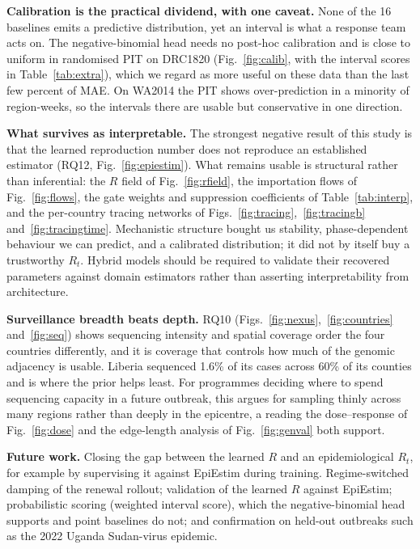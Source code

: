 \documentclass[conference]{IEEEtran}
\begin{document}
\textbf{Calibration is the practical dividend, with one caveat.} None of the 16 baselines emits a predictive distribution, yet an interval is what a response team acts on. The negative-binomial head needs no post-hoc calibration and is close to uniform in randomised PIT on DRC1820 (Fig.~\ref{fig:calib}, with the interval scores in Table~\ref{tab:extra}), which we regard as more useful on these data than the last few percent of MAE. On WA2014 the PIT shows over-prediction in a minority of region-weeks, so the intervals there are usable but conservative in one direction.

\textbf{What survives as interpretable.} The strongest negative result of this study is that the learned reproduction number does not reproduce an established estimator (RQ12, Fig.~\ref{fig:epiestim}). What remains usable is structural rather than inferential: the $R$ field of Fig.~\ref{fig:rfield}, the importation flows of Fig.~\ref{fig:flows}, the gate weights and suppression coefficients of Table~\ref{tab:interp}, and the per-country tracing networks of Figs.~\ref{fig:tracing},~\ref{fig:tracingb} and~\ref{fig:tracingtime}. Mechanistic structure bought us stability, phase-dependent behaviour we can predict, and a calibrated distribution; it did not by itself buy a trustworthy $R_t$. Hybrid models should be required to validate their recovered parameters against domain estimators rather than asserting interpretability from architecture.

\textbf{Surveillance breadth beats depth.} RQ10 (Figs.~\ref{fig:nexus},~\ref{fig:countries} and~\ref{fig:seq}) shows sequencing intensity and spatial coverage order the four countries differently, and it is coverage that controls how much of the genomic adjacency is usable. Liberia sequenced 1.6\% of its cases across 60\% of its counties and is where the prior helps least. For programmes deciding where to spend sequencing capacity in a future outbreak, this argues for sampling thinly across many regions rather than deeply in the epicentre, a reading the dose--response of Fig.~\ref{fig:dose} and the edge-length analysis of Fig.~\ref{fig:genval} both support.

\textbf{Future work.} Closing the gap between the learned $R$ and an epidemiological $R_t$, for example by supervising it against EpiEstim during training. Regime-switched damping of the renewal rollout; validation of the learned $R$ against EpiEstim; probabilistic scoring (weighted interval score), which the negative-binomial head supports and point baselines do not; and confirmation on held-out outbreaks such as the 2022 Uganda Sudan-virus epidemic.
\end{document}
